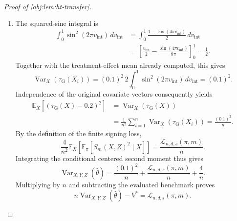 \begin{proof}[Proof of \cref{obj:lem:ht-transfer}]
\begin{enumerate}
\item
The squared-sine integral is
\[
\begin{aligned}
\int_0^1\sin^2(2\pi v_{\mathrm{int}})\,dv_{\mathrm{int}}
&=
\int_0^1\frac{1-\cos(4\pi v_{\mathrm{int}})}2\,dv_{\mathrm{int}}\\
&=
\left[
\frac{v_{\mathrm{int}}}{2}
-\frac{\sin(4\pi v_{\mathrm{int}})}{8\pi}
\right]_0^1
=\frac12.
\end{aligned}
\]
Together with the treatment-effect mean already computed, this gives
\[
\operatorname{Var}_X(\tau_{\mathrm G}(X_i))
=
(0.1)^2\,2\int_0^1
\sin^2(2\pi v_{\mathrm{int}})\,dv_{\mathrm{int}}
=
(0.1)^2.
\]
Independence of the original covariate vectors consequently yields
\[
\begin{aligned}
\mathbb E_X[
(\overline\tau_{\mathrm G}(X)-0.2)^2]
&=
\operatorname{Var}_X(\overline\tau_{\mathrm G}(X))\\
&=
\frac1{n^2}\sum_{i=1}^n
\operatorname{Var}_X(\tau_{\mathrm G}(X_i))
=
\frac{(0.1)^2}{n}.
\end{aligned}
\]
By the definition of the finite signing loss,
\[
\frac4{n^2}
\mathbb E_X\!\left[
\mathbb E_\pi[S_m(X,Z)^2\mid X]
\right]
=
\frac{\mathcal L_{n,d,s}(\pi,m)}{n}.
\]
Integrating the conditional centered second moment thus gives
\[
\operatorname{Var}_{X,Y,Z}(\widehat\theta)
=
\frac{(0.1)^2}{n}
+\frac{\mathcal L_{n,d,s}(\pi,m)}{n}
+\frac4n.
\]
Multiplying by \(n\) and subtracting the evaluated benchmark proves
\[
n\operatorname{Var}_{X,Y,Z}(\widehat\theta)-V^*
=
\mathcal L_{n,d,s}(\pi,m).
\]
\end{enumerate}
\end{proof}

